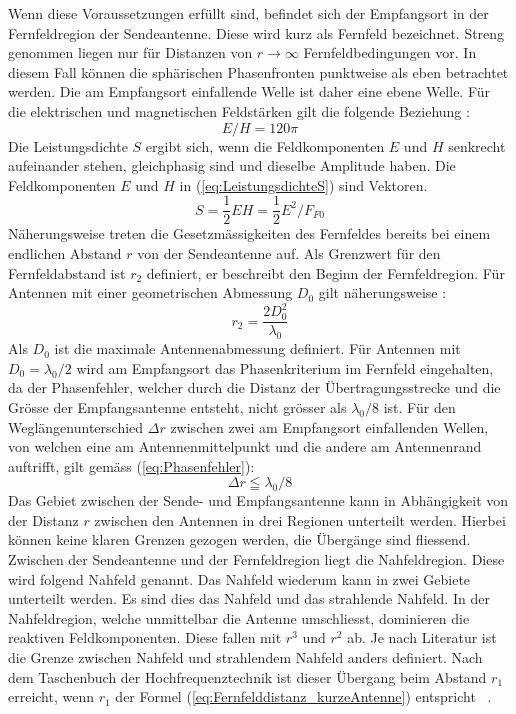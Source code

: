  Wenn diese Voraussetzungen erfüllt sind, befindet sich der Empfangsort in der Fernfeldregion der Sendeantenne. Diese wird kurz als Fernfeld bezeichnet. Streng genommen liegen nur für Distanzen von $r\rightarrow\infty$ Fernfeldbedingungen vor. In diesem Fall können die sphärischen Phasenfronten punktweise als eben betrachtet werden. Die am Empfangsort einfallende Welle ist daher eine ebene Welle. Für die elektrischen und magnetischen Feldstärken gilt die folgende Beziehung \cite{meinke1992taschenbuch}:
\begin{equation}
E/H=120\pi\label{eq:WellenimpedanuE/H}
\end{equation}
Die Leistungsdichte $S$ ergibt sich, wenn die Feldkomponenten $E$ und $H$ senkrecht aufeinander stehen, gleichphasig sind und dieselbe Amplitude haben. Die Feldkomponenten $E$ und $H$ in (\ref{eq:LeistungsdichteS}) sind Vektoren. 
\begin{equation}
S=\dfrac{1}{2}EH=\dfrac{1}{2} E^{2}/F_{F0}\label{eq:LeistungsdichteS}
\end{equation}
Näherungsweise treten die Gesetzmässigkeiten des Fernfeldes bereits bei einem endlichen Abstand $r$ von der Sendeantenne auf. Als Grenzwert für den Fernfeldabstand ist $r_{2}$ definiert, er beschreibt den Beginn der Fernfeldregion. Für Antennen mit einer geometrischen Abmessung $D_{0}$ gilt näherungsweise \cite{meinke1992taschenbuch}:
\begin{equation}
r_{2}=\dfrac{2D_{0}^{2}}{\lambda_{0}} \label{eq:Fernfelddistanz_r2}
\end{equation}
Als $D_{0}$ ist die maximale Antennenabmessung definiert. Für Antennen mit $D_{0}=\lambda_{0}/2$ wird am Empfangsort das Phasenkriterium im Fernfeld eingehalten, da der Phasenfehler, welcher durch die Distanz der Übertragungsstrecke und die Grösse der Empfangsantenne entsteht, nicht grösser als $\lambda_{0}/8$ ist. Für den Weglängenunterschied $\Delta r$ zwischen zwei am Empfangsort einfallenden Wellen, von welchen eine am Antennenmittelpunkt und die andere am Antennenrand auftrifft, gilt gemäss (\ref{eq:Phasenfehler})\cite{meinke1992taschenbuch}:
\begin{equation}
\Delta r\leqq\lambda_{0}/8 \label{eq:Phasenfehler}
\end{equation}
Das Gebiet zwischen der Sende- und Empfangsantenne kann in Abhängigkeit von der Distanz $r$ zwischen den Antennen in drei Regionen unterteilt werden. Hierbei können keine klaren Grenzen gezogen werden, die Übergänge sind fliessend. Zwischen der Sendeantenne und der Fernfeldregion liegt die Nahfeldregion. Diese wird folgend Nahfeld genannt. Das Nahfeld wiederum kann in zwei Gebiete unterteilt werden. Es sind dies das Nahfeld und das strahlende Nahfeld. In der Nahfeldregion, welche unmittelbar die Antenne umschliesst, dominieren die reaktiven Feldkomponenten. Diese fallen mit $r^{3}$ und $r^{2}$ ab. Je nach Literatur ist die Grenze zwischen Nahfeld und strahlendem Nahfeld anders definiert. Nach dem Taschenbuch der Hochfrequenztechnik ist dieser Übergang beim Abstand $r_{1}$ erreicht, wenn $r_{1}$ der Formel (\ref{eq:Fernfelddistanz_kurzeAntenne}) entspricht \ \cite{meinke1992taschenbuch}.

